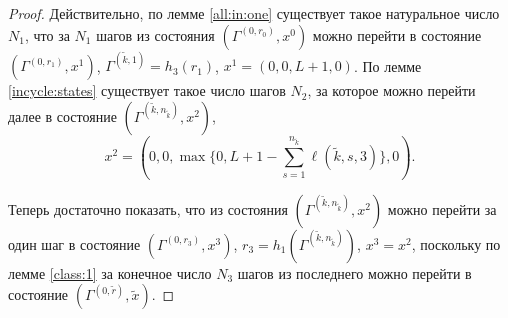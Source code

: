 \documentclass{report}
\begin{document}
\begin{proof}
Действительно, по лемме \ref{all:in:one} существует такое натуральное число $N_1$, что за $N_1$ шагов из состояния $(\Gamma^{(0,r_0)},x^0)$ можно перейти в состояние  $(\Gamma^{(0,r_1)},x^1)$, $\Gamma^{(\tilde{k},1)}=h_3(r_1)$, $x^1=(0,0,L+1,0)$. По лемме \ref{incycle:states} существует такое число шагов $N_2$, за которое можно перейти далее в состояние $(\Gamma^{(\tilde{k},n_{\tilde{k}})},x^2)$, 
\begin{equation*}
x^2=(0,0,\max{\{0,L+1-\sum_{s=1}^{n_{\tilde{k}}} \ell(\tilde{k},s,3)\}},0).
\end{equation*}

Теперь достаточно показать, что из состояния $(\Gamma^{(\tilde{k},n_{\tilde{k}})},x^2)$ можно перейти за один шаг в состояние $(\Gamma^{(0,r_3)},x^3)$, $r_3=h_1(\Gamma^{(\tilde{k},n_{\tilde{k}})})$, $x^3=x^2$, поскольку по лемме \ref{class:1} за конечное число $N_3$ шагов из последнего можно перейти в состояние $(\Gamma^{(0,\tilde{r})},\tilde{x})$.


\end{proof}
\end{document}
